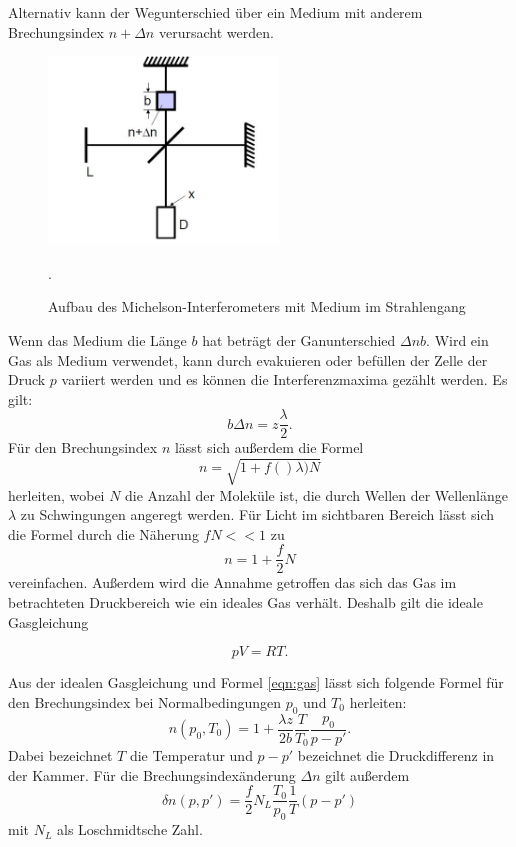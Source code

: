 Alternativ kann der Wegunterschied über ein Medium mit anderem Brechungsindex $n+\Delta n$
verursacht werden.
\begin{figure}[H]
  \centering
  \includegraphics[height=5cm]{gas.JPG}
  \caption{Aufbau des Michelson-Interferometers mit Medium im Strahlengang}
  \label{fig:gas}
  \cite{skript}.
\end{figure}

Wenn das Medium die Länge $b$ hat beträgt der Ganunterschied $\Delta nb$.
Wird ein Gas als Medium verwendet, kann durch evakuieren oder befüllen der Zelle der
Druck $p$ variiert werden und es können die Interferenzmaxima gezählt werden.
Es gilt:
\begin{equation}
  b\Delta n = z \frac{\lambda}{2}
  \label{eqn:gas}.
\end{equation}
Für den Brechungsindex $n$ lässt sich außerdem die Formel
\begin{equation}
  n=\sqrt{1+f()\lambda)N}
\end{equation}
herleiten, wobei $N$ die Anzahl der Moleküle ist, die durch Wellen der Wellenlänge
$\lambda$ zu Schwingungen angeregt werden. Für Licht im sichtbaren Bereich lässt
sich die Formel durch die Näherung $fN<<1$  zu
\begin{equation}
  n=1+\frac{f}{2}N
\end{equation}
vereinfachen.
Außerdem wird die Annahme getroffen das sich das Gas im betrachteten Druckbereich
wie ein ideales Gas verhält. Deshalb gilt die ideale Gasgleichung

\begin{equation}
  pV=RT.
\end{equation}

Aus der idealen Gasgleichung und Formel \ref{eqn:gas} lässt sich folgende Formel für
den Brechungsindex bei Normalbedingungen $p_{0}$ und $T_{0}$ herleiten:
\begin{equation}
  n(p_{0},T_{0})= 1+ \frac{\lambda z}{2b}\frac{T}{T_{0}}\frac{p_{0}}{p-p'}.
\end{equation}
Dabei bezeichnet $T$ die Temperatur und $p-p'$ bezeichnet die Druckdifferenz in der Kammer.
Für die Brechungsindexänderung $\Delta n$ gilt außerdem
\begin{equation}
  \delta n(p,p')= \frac{f}{2}N_{L}\frac{T_{0}}{p_{0}}\frac{1}{T}(p-p')
\end{equation}
mit $N_{L}$ als Loschmidtsche Zahl.
